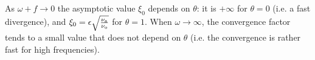 As $\omega + f \to 0$ the asymptotic value 
$\xi_0$ depends on $\theta$: it is $+\infty$ for $\theta=0$ (i.e. a fast divergence), and $\xi_0 = \epsilon\sqrt{\frac{\nu_{\rm a}}{\nu_{\rm o}}}$ for $\theta=1$.
When $\omega\to \infty$, the convergence factor tends to a small value
that does not depend on $\theta$
(i.e. the convergence is rather fast for high frequencies).
